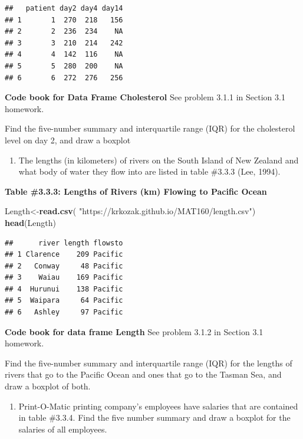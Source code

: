 \documentclass[
]{book}
\newenvironment{Shaded}{\begin{snugshade}}{\end{snugshade}}
\newcommand{\KeywordTok}[1]{\textcolor[rgb]{0.13,0.29,0.53}{\textbf{#1}}}
\newcommand{\NormalTok}[1]{#1}
\newcommand{\StringTok}[1]{\textcolor[rgb]{0.31,0.60,0.02}{#1}}
\providecommand{\tightlist}{%
  \setlength{\itemsep}{0pt}\setlength{\parskip}{0pt}}
\begin{document}
\begin{verbatim}
##   patient day2 day4 day14
## 1       1  270  218   156
## 2       2  236  234    NA
## 3       3  210  214   242
## 4       4  142  116    NA
## 5       5  280  200    NA
## 6       6  272  276   256
\end{verbatim}

\textbf{Code book for Data Frame Cholesterol} See problem 3.1.1 in Section 3.1 homework.

Find the five-number summary and interquartile range (IQR) for the cholesterol level on day 2, and draw a boxplot

\begin{enumerate}
\def\labelenumi{\arabic{enumi}.}
\setcounter{enumi}{5}
\tightlist
\item
  The lengths (in kilometers) of rivers on the South Island of New Zealand and what body of water they flow into are listed in table \#3.3.3 (Lee, 1994).
\end{enumerate}

\textbf{Table \#3.3.3: Lengths of Rivers (km) Flowing to Pacific Ocean}

\begin{Shaded}
\begin{Highlighting}[]
\NormalTok{Length<-}\KeywordTok{read.csv}\NormalTok{(}
  \StringTok{"https://krkozak.github.io/MAT160/length.csv"}\NormalTok{)}
\KeywordTok{head}\NormalTok{(Length)}
\end{Highlighting}
\end{Shaded}

\begin{verbatim}
##      river length flowsto
## 1 Clarence    209 Pacific
## 2   Conway     48 Pacific
## 3    Waiau    169 Pacific
## 4  Hurunui    138 Pacific
## 5  Waipara     64 Pacific
## 6   Ashley     97 Pacific
\end{verbatim}

\textbf{Code book for data frame Length} See problem 3.1.2 in Section 3.1 homework.

Find the five-number summary and interquartile range (IQR) for the lengths of rivers that go to the Pacific Ocean and ones that go to the Tasman Sea, and draw a boxplot of both.

\begin{enumerate}
\def\labelenumi{\arabic{enumi}.}
\setcounter{enumi}{6}
\tightlist
\item
  Print-O-Matic printing company's employees have salaries that are contained in table \#3.3.4. Find the five number summary and draw a boxplot for the salaries of all employees.
\end{enumerate}
\end{document}
